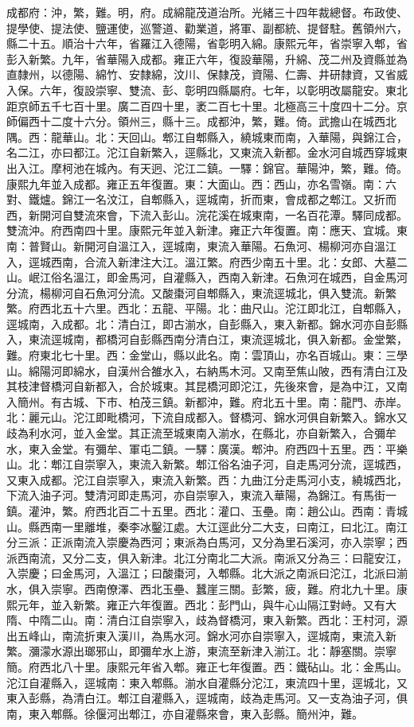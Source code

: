 \begin{pinyinscope}
成都府：沖，繁，難。明，府。成綿龍茂道治所。光緒三十四年裁總督。布政使、提學使、提法使、鹽運使，巡警道、勸業道，將軍、副都統、提督駐。舊領州六，縣二十五。順治十六年，省羅江入德陽，省彰明入綿。康熙元年，省崇寧入郫，省彭入新繁。九年，省華陽入成都。雍正六年，復設華陽，升綿、茂二州及資縣並為直隸州，以德陽、綿竹、安隸綿，汶川、保隸茂，資陽、仁壽、井研隸資，又省威入保。六年，復設崇寧、雙流、彭、彰明四縣屬府。七年，以彰明改屬龍安。東北距京師五千七百十里。廣二百四十里，袤二百七十里。北極高三十度四十二分。京師偏西十二度十六分。領州三，縣十三。成都沖，繁，難。倚。武擔山在城西北隅。西：龍華山。北：天回山。郫江自郫縣入，繞城東而南，入華陽，與錦江合，名二江，亦曰都江。沱江自新繁入，逕縣北，又東流入新都。金水河自城西穿城東出入江。摩柯池在城內。有天迥、沱江二鎮。一驛：錦官。華陽沖，繁，難。倚。康熙九年並入成都。雍正五年復置。東：大面山。西：西山，亦名雪嶺。南：六對、鐵爐。錦江一名汶江，自郫縣入，逕城南，折而東，會成都之郫江。又折而西，新開河自雙流來會，下流入彭山。浣花溪在城東南，一名百花潭。驛同成都。雙流沖。府西南四十里。康熙元年並入新津。雍正六年復置。南：應天、宜城。東南：普賢山。新開河自溫江入，逕城南，東流入華陽。石魚河、楊柳河亦自溫江入，逕城西南，合流入新津注大江。溫江繁。府西少南五十里。北：女郎、大墓二山。岷江俗名溫江，即金馬河，自灌縣入，西南入新津。石魚河在城西，自金馬河分流，楊柳河自石魚河分流。又酸棗河自郫縣入，東流逕城北，俱入雙流。新繁繁。府西北五十六里。西北：五龍、平陽。北：曲尺山。沱江即北江，自郫縣入，逕城南，入成都。北：清白江，即古湔水，自彭縣入，東入新都。錦水河亦自彭縣入，東流逕城南，都橋河自彭縣西南分清白江，東流逕城北，俱入新都。金堂繁，難。府東北七十里。西：金堂山，縣以此名。南：雲頂山，亦名百城山。東：三學山。綿陽河即綿水，自漢州合雒水入，右納馬木河。又南至焦山陂，西有清白江及其枝津督橋河自新都入，合於城東。其昆橋河即沱江，先後來會，是為中江，又南入簡州。有古城、下市、柏茂三鎮。新都沖，難。府北五十里。南：龍門、赤岸。北：麗元山。沱江即毗橋河，下流自成都入。督橋河、錦水河俱自新繁入。錦水又歧為利水河，並入金堂。其正流至城東南入湔水，在縣北，亦自新繁入，合彌牟水，東入金堂。有彌牟、軍屯二鎮。一驛：廣漢。郫沖。府西四十五里。西：平樂山。北：郫江自崇寧入，東流入新繁。郫江俗名油子河，自走馬河分流，逕城西，又東入成都。沱江自崇寧入，東流入新繁。西：九曲江分走馬河小支，繞城西北，下流入油子河。雙清河即走馬河，亦自崇寧入，東流入華陽，為錦江。有馬街一鎮。灌沖，繁。府西北百二十五里。西北：灌口、玉壘。南：趙公山。西南：青城山。縣西南一里離堆，秦李冰鑿江處。大江逕此分二大支，曰南江，曰北江。南江分三派：正派南流入崇慶為西河；東派為白馬河，又分為里石溪河，亦入崇寧；西派西南流，又分二支，俱入新津。北江分南北二大派。南派又分為三：曰龍安江，入崇慶；曰金馬河，入溫江；曰酸棗河，入郫縣。北大派之南派曰沱江，北派曰湔水，俱入崇寧。西南僚澤、西北玉壘、蠶崖三關。彭繁，疲，難。府北九十里。康熙元年，並入新繁。雍正六年復置。西北：彭門山，與牛心山隔江對峙。又有大隋、中隋二山。南：清白江自崇寧入，歧為督橋河，東入新繁。西北：王村河，源出五峰山，南流折東入漢川，為馬水河。錦水河亦自崇寧入，逕城南，東流入新繁。瀰濛水源出瑯邪山，即彌牟水上游，東流至新津入湔江。北：靜塞關。崇寧簡。府西北八十里。康熙元年省入郫。雍正七年復置。西：鐵砧山。北：金馬山。沱江自灌縣入，逕城南：東入郫縣。湔水自灌縣分沱江，東流四十里，逕城北，又東入彭縣，為清白江。郫江自灌縣入，逕城南，歧為走馬河。又一支為油子河，俱南，東入郫縣。徐偃河出郫江，亦自灌縣來會，東入彭縣。簡州沖，難。
\end{pinyinscope}
